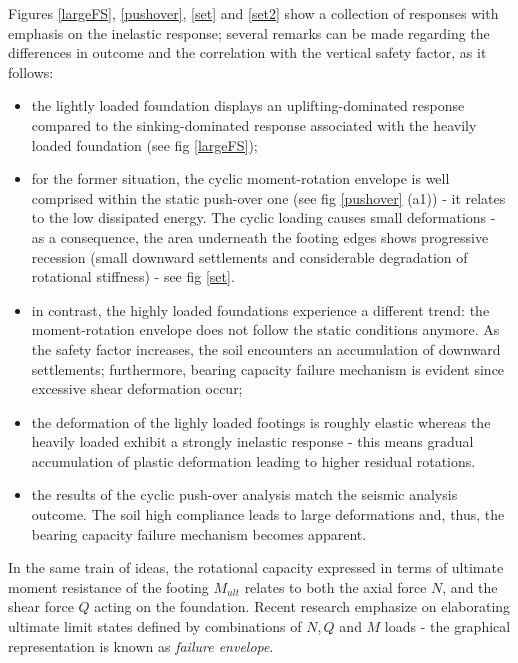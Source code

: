 \documentclass[11pt,a4paper]{report}
\begin{document}
\newpage
Figures \ref{largeFS}, \ref{pushover}, \ref{set} and \ref{set2} show a collection of responses with emphasis on the inelastic response; several remarks can be made regarding the differences in outcome and the correlation with the vertical safety factor, as it follows:

\begin{itemize}
	\item the lightly loaded foundation displays an uplifting-dominated response compared to the sinking-dominated response associated with the heavily loaded foundation (see fig \ref{largeFS});
	\item for the former situation, the cyclic moment-rotation envelope is well comprised within the static push-over one (see fig \ref{pushover} (a1)) - it relates to the low dissipated energy. The cyclic loading causes small deformations - as a consequence, the area underneath the footing edges shows progressive recession (small downward settlements and considerable degradation of rotational stiffness) - see fig \ref{set}. 
	\item in contrast, the highly loaded foundations experience a different trend: the moment-rotation envelope does not follow the static conditions anymore. As the safety factor increases, the soil encounters an accumulation of downward settlements; furthermore, bearing capacity failure mechanism is evident since excessive shear deformation occur;
	\item the deformation of the lighly loaded footings is roughly elastic whereas the heavily loaded exhibit a strongly inelastic response - this means gradual accumulation of plastic deformation leading to higher residual rotations.
	\item the results of the cyclic push-over analysis match the seismic analysis outcome. The soil high compliance leads to large deformations and, thus, the bearing capacity failure mechanism becomes apparent.
\end{itemize}

In the same train of ideas, the rotational capacity expressed in terms of ultimate moment resistance of the footing $M_{ult}$ relates to both the axial force $N$, and the shear force $Q$ acting on the foundation. Recent research emphasize on elaborating ultimate limit states defined by combinations of $N, Q$ and $M$ loads - the \mbox{graphical} representation is known as \textit{failure envelope}.
	 
\end{document}
